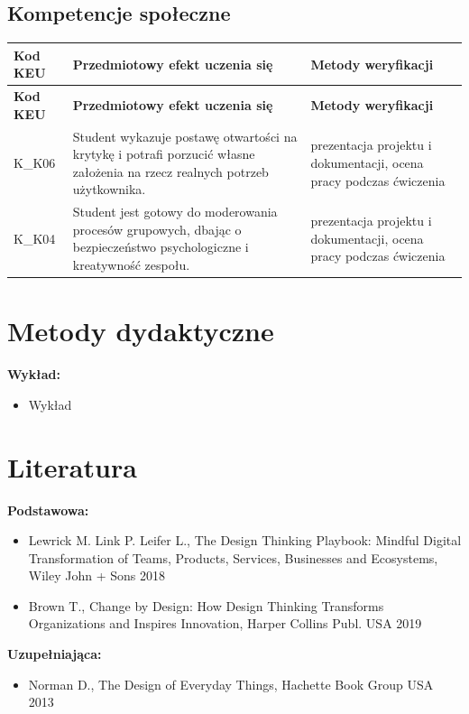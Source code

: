\documentclass[12pt, a4paper]{article}
\newcommand{\thdrule}{\noalign{\global\setlength{\extrarowheight}{0pt}}}
\newcommand{\thdend}{\noalign{\global\setlength{\extrarowheight}{3pt}}}
\begin{document}
\subsection*{Kompetencje społeczne}
{\scriptsize
\begin{longtable}{m{1.6cm}m{9.0cm}m{4.2cm}}
\thdrule\toprule
\rowcolor{pjatkRed} {\color{white}\footnotesize\textbf{\vphantom{Ag}Kod KEU}} & {\color{white}\footnotesize\textbf{\vphantom{Ag}Przedmiotowy efekt uczenia się}} & {\color{white}\footnotesize\textbf{\vphantom{Ag}Metody weryfikacji}} \\
\midrule\thdend
\endfirsthead
\thdrule\toprule
\rowcolor{pjatkRed} {\color{white}\footnotesize\textbf{\vphantom{Ag}Kod KEU}} & {\color{white}\footnotesize\textbf{\vphantom{Ag}Przedmiotowy efekt uczenia się}} & {\color{white}\footnotesize\textbf{\vphantom{Ag}Metody weryfikacji}} \\
\midrule\thdend
\endhead
  \rowcolor{tableRowLight} K\_K06 & Student wykazuje postawę otwartości na krytykę i potrafi porzucić własne założenia na rzecz realnych potrzeb użytkownika. & prezentacja projektu i dokumentacji, ocena pracy podczas ćwiczenia \\
  \rowcolor{tableRowAlt} K\_K04 & Student jest gotowy do moderowania procesów grupowych, dbając o bezpieczeństwo psychologiczne i kreatywność zespołu. & prezentacja projektu i dokumentacji, ocena pracy podczas ćwiczenia \\
\bottomrule
\end{longtable}}

\section{Metody dydaktyczne}

\textbf{Wykład:}
\begin{itemize}
  \item Wykład
\end{itemize}
\vspace{4pt}


\section{Literatura}

\textbf{Podstawowa:}
\begin{itemize}
  \item Lewrick M. Link P. Leifer L., The Design Thinking Playbook: Mindful Digital Transformation of Teams, Products, Services, Businesses and Ecosystems, Wiley John + Sons 2018
  \item Brown T., Change by Design: How Design Thinking Transforms Organizations and Inspires Innovation, Harper Collins Publ. USA 2019
\end{itemize}

\textbf{Uzupełniająca:}
\begin{itemize}
  \item Norman D., The Design of Everyday Things, Hachette Book Group USA 2013
\end{itemize}
\end{document}
